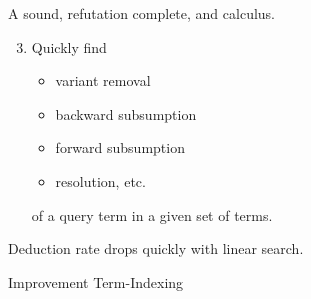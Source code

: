 

\begin{goal}
	A sound, refutation complete, and  calculus.\\[0.5em]
	\begin{enumerate}
		\setcounter{enumi}{2}
		\item Quickly find
\begin{itemize}

\item {} \hfill{\colG\footnotesize variant removal}
%

\item {}   \hfill{\colG\footnotesize backward subsumption}\\

\item {}  \hfill{\colG\footnotesize forward subsumption}\\

\item {} \hfill{\colG\footnotesize resolution, etc.}\\

\end{itemize}
of a query term in a given set of terms.
\end{enumerate}

\end{goal}


	\begin{observation}
		Deduction rate drops quickly with linear search.
	\end{observation}
	
	
	
	\begin{block}{Improvement}
		Term-Indexing
	\end{block}